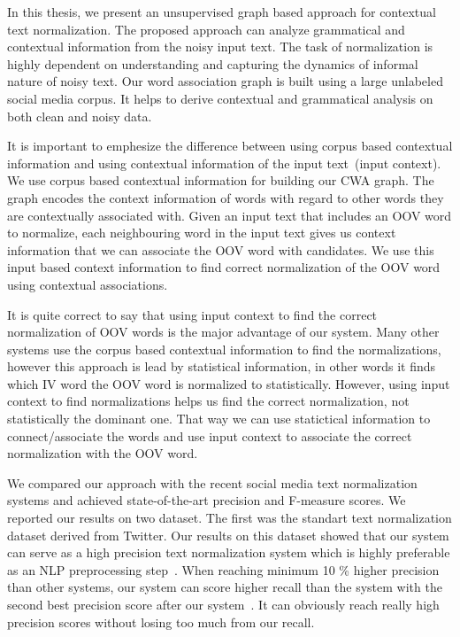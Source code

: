 \documentclass[a4paper,onesided,12pt]{report}
\begin{document}
In this thesis, we present an unsupervised graph based approach for contextual text normalization. The proposed approach can analyze grammatical and contextual information from the noisy input text. The task of normalization is highly dependent on understanding and capturing the dynamics of informal nature of noisy text. Our word association graph is built using a large unlabeled social media corpus. It helps to derive contextual and grammatical analysis on both clean and noisy data.

It is important to emphesize the difference between using corpus based contextual information and using contextual information of the input text~(input context). We use corpus based contextual information for building our CWA graph. The graph encodes the context information of words with regard to other words they are contextually associated with. Given an input text that includes an OOV word to normalize, each neighbouring word in the input text gives us context information that we can associate the OOV word with candidates. We use this input based context information to find correct normalization of the OOV word using contextual associations.

It is quite correct to say that using input context to find the correct normalization of OOV words is the major advantage of our system. Many other systems use the corpus based contextual information to find the normalizations, however this approach is lead by statistical information, in other words it finds which IV word the OOV word is normalized to statistically. However, using input context to find normalizations helps us find the correct normalization, not statistically the dominant one.  That way we can use statictical information to connect/associate the words and use input context to associate the correct normalization with the OOV word.

We compared our approach with the recent social media text normalization systems and achieved state-of-the-art precision and F-measure scores. We reported our results on two dataset. The first was the standart text normalization dataset derived from Twitter. Our results on this dataset showed that our system can serve as a high precision text normalization system which is highly preferable as an NLP preprocessing step~\cite{DBLP:conf/acl/HassanM13}. When reaching minimum 10 \% higher precision than other systems, our system can score higher recall than the system with the second best precision score after our system~\cite{DBLP:conf/acl/HassanM13}. It can obviously reach really high precision scores without losing too much from our recall.
\end{document}
